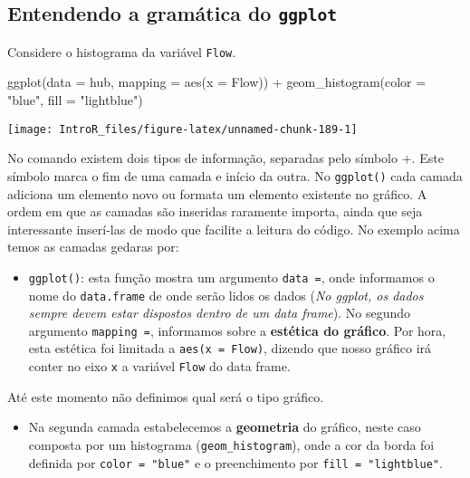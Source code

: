 \documentclass[
]{book}
\newenvironment{Shaded}{\begin{snugshade}}{\end{snugshade}}
\newcommand{\AttributeTok}[1]{\textcolor[rgb]{0.77,0.63,0.00}{#1}}
\newcommand{\FunctionTok}[1]{\textcolor[rgb]{0.00,0.00,0.00}{#1}}
\newcommand{\NormalTok}[1]{#1}
\newcommand{\SpecialCharTok}[1]{\textcolor[rgb]{0.00,0.00,0.00}{#1}}
\newcommand{\StringTok}[1]{\textcolor[rgb]{0.31,0.60,0.02}{#1}}
\providecommand{\tightlist}{%
  \setlength{\itemsep}{0pt}\setlength{\parskip}{0pt}}
\begin{document}
\hypertarget{entendendo-a-gramuxe1tica-do-ggplot}{%
\subsection{\texorpdfstring{Entendendo a gramática do \texttt{ggplot}}{Entendendo a gramática do ggplot}}\label{entendendo-a-gramuxe1tica-do-ggplot}}

Considere o histograma da variável \texttt{Flow}.

\begin{Shaded}
\begin{Highlighting}[]
\FunctionTok{ggplot}\NormalTok{(}\AttributeTok{data =}\NormalTok{ hub, }\AttributeTok{mapping =} \FunctionTok{aes}\NormalTok{(}\AttributeTok{x =}\NormalTok{ Flow)) }\SpecialCharTok{+}
  \FunctionTok{geom\_histogram}\NormalTok{(}\AttributeTok{color =} \StringTok{"blue"}\NormalTok{, }\AttributeTok{fill =} \StringTok{"lightblue"}\NormalTok{)}
\end{Highlighting}
\end{Shaded}

\begin{center}\texttt{[image: IntroR\_files/figure-latex/unnamed-chunk-189-1]} \end{center}

No comando existem dois tipos de informação, separadas pelo símbolo \(+\). Este símbolo marca o fim de uma camada e início da outra. No \texttt{ggplot()} cada camada adiciona um elemento novo ou formata um elemento existente no gráfico. A ordem em que as camadas são inseridas raramente importa, ainda que seja interessante inserí-las de modo que facilite a leitura do código. No exemplo acima temos as camadas gedaras por:

\begin{itemize}
\tightlist
\item
  \texttt{ggplot()}: esta função mostra um argumento \texttt{data\ =}, onde informamos o nome do \texttt{data.frame} de onde serão lidos os dados (\emph{No ggplot, os dados sempre devem estar dispostos dentro de um data frame}). No segundo argumento \texttt{mapping\ =}, informamos sobre a \textbf{estética do gráfico}. Por hora, esta estética foi limitada a \texttt{aes(x\ =\ Flow)}, dizendo que nosso gráfico irá conter no eixo \texttt{x} a variável \texttt{Flow} do data frame.
\end{itemize}

Até este momento não definimos qual será o tipo gráfico.

\begin{itemize}
\tightlist
\item
  Na segunda camada estabelecemos a \textbf{geometria} do gráfico, neste caso composta por um histograma (\texttt{geom\_histogram}), onde a cor da borda foi definida por \texttt{color\ =\ "blue"} e o preenchimento por \texttt{fill\ =\ "lightblue"}.
\end{itemize}
\end{document}

